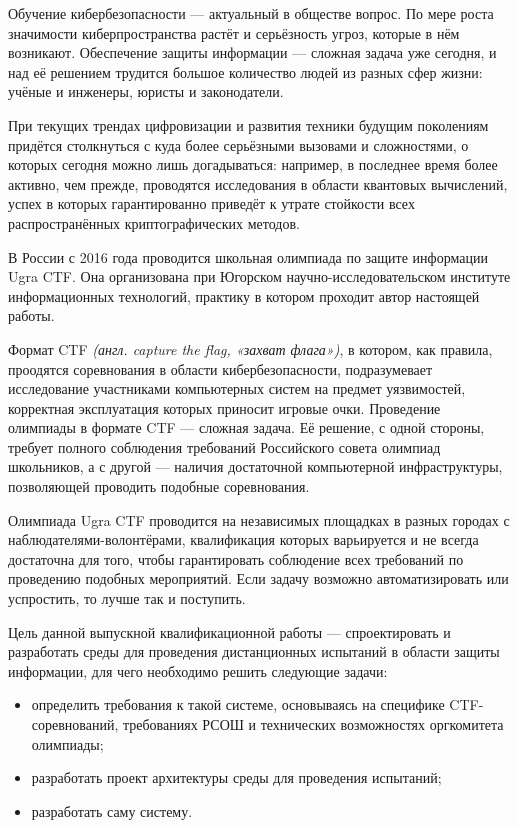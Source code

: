 \Introduction

Обучение кибербезопасности --- актуальный в обществе вопрос\cite{DigitalisationTempo}. По мере роста значимости киберпространства растёт и серьёзность угроз, которые в нём возникают. Обеспечение защиты информации — сложная задача уже сегодня, и над её решением трудится большое количество людей из разных сфер жизни: учёные и инженеры, юристы и законодатели.

При текущих трендах цифровизации и развития техники будущим поколениям придётся столкнуться с куда более серьёзными вызовами и сложностями, о которых сегодня можно лишь догадываться: например, в последнее время более активно, чем прежде, проводятся исследования в области квантовых вычислений\cite{Quantum1}\cite{Quantum2}, успех в которых гарантированно приведёт к утрате стойкости всех распространённых криптографических методов\cite{Quantum3}.

В России с 2016 года проводится школьная олимпиада по защите информации Ugra CTF\cite{UgraHistory}. Она организована при Югорском научно-исследовательском институте информационных технологий, практику в котором проходит автор настоящей работы.

Формат CTF \textit{(англ. capture the flag, «захват флага»)}, в котором, как правила, проодятся соревнования в области кибербезопасности, подразумевает исследование участниками компьютерных систем на предмет уязвимостей, корректная эксплуатация которых приносит игровые очки. Проведение олимпиады в формате CTF — сложная задача. Её решение, с одной стороны, требует полного соблюдения требований Российского совета олимпиад школьников\cite{Rosolymp}, а с другой — наличия достаточной компьютерной инфраструктуры, позволяющей проводить подобные соревнования.

Олимпиада Ugra CTF проводится на независимых площадках в разных городах с наблюдателями-волонтёрами, квалификация которых варьируется и не всегда достаточна для того, чтобы гарантировать соблюдение всех требований по проведению подобных мероприятий. Если задачу возможно автоматизировать или успростить, то лучше так и поступить.

Цель данной выпускной квалификационной работы --- спроектировать и разработать среды для проведения дистанционных испытаний в области защиты информации, для чего необходимо решить следующие задачи:
\begin{itemize}
\item определить требования к такой системе, основываясь на специфике CTF-соревнований, требованиях РСОШ и технических возможностях оргкомитета олимпиады;
\item разработать проект архитектуры среды для проведения испытаний;
\item разработать саму систему.
\end{itemize}

